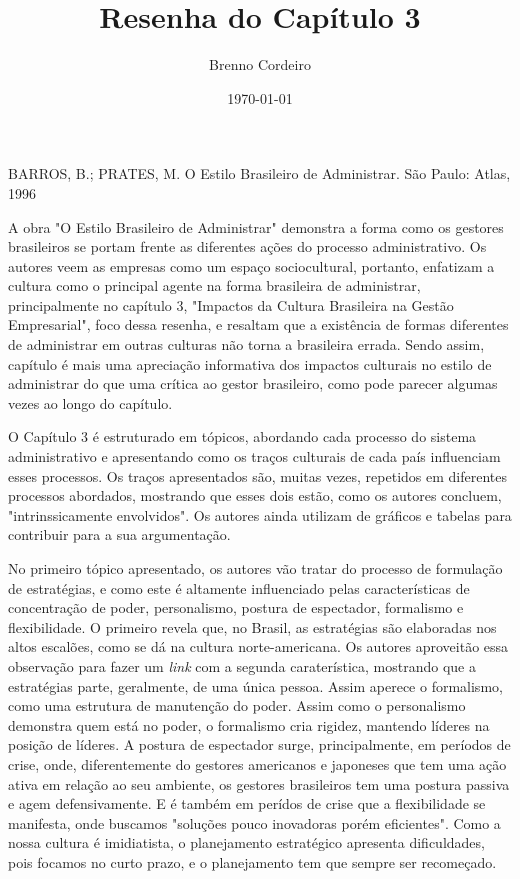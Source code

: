 \documentclass[11pt, a4paper]{article}
\title{Resenha do Capítulo 3}
\author{Brenno Cordeiro}
\date{\today}
\begin{document}
\maketitle


BARROS, B.; PRATES, M. O Estilo Brasileiro de Administrar. São Paulo: Atlas, 1996

A obra "O Estilo Brasileiro de Administrar" demonstra a forma como os gestores brasileiros se portam frente as diferentes ações do processo administrativo. Os autores veem as empresas como um espaço sociocultural, portanto,  enfatizam a cultura como o principal agente na forma brasileira de administrar, principalmente no capítulo 3, "Impactos da Cultura Brasileira na Gestão Empresarial", foco dessa resenha, e resaltam que a existência de formas diferentes de administrar em outras culturas não torna a brasileira errada. Sendo assim, capítulo é mais uma
apreciação informativa dos impactos culturais no estilo de administrar do que uma crítica ao gestor brasileiro, como pode parecer algumas vezes ao longo do capítulo.

O Capítulo 3 é estruturado em tópicos, abordando cada processo do sistema administrativo e apresentando como os traços culturais de cada país influenciam esses processos. Os traços apresentados são, muitas vezes, repetidos em diferentes processos abordados, mostrando que esses dois estão, como os autores concluem, "intrinssicamente envolvidos". Os autores ainda utilizam de gráficos e tabelas para contribuir para a sua argumentação.

No primeiro tópico apresentado, os autores vão tratar do processo de formulação de estratégias, e como este é altamente influenciado pelas características de concentração de poder, personalismo, postura de espectador, formalismo e flexibilidade. O primeiro revela que, no Brasil, as estratégias são elaboradas nos altos escalões, como se dá na cultura norte-americana. Os autores aproveitão essa observação para fazer um \emph{link} com a segunda caraterística, mostrando que a estratégias parte, geralmente, de uma única pessoa. Assim aperece o formalismo, como uma estrutura de manutenção do poder. Assim como o personalismo demonstra quem está no poder, o formalismo cria rigidez, mantendo líderes na posição de líderes. A postura de espectador surge, principalmente, em períodos de crise, onde, diferentemente do gestores americanos e japoneses que tem uma ação ativa em relação ao seu ambiente, os gestores brasileiros tem uma postura passiva e agem defensivamente. E é também em perídos de crise que a flexibilidade se manifesta, onde buscamos "soluções pouco inovadoras porém eficientes". Como a nossa cultura é imidiatista, o planejamento estratégico apresenta dificuldades, pois focamos no curto prazo, e o planejamento tem que sempre ser recomeçado.
\end{document}
